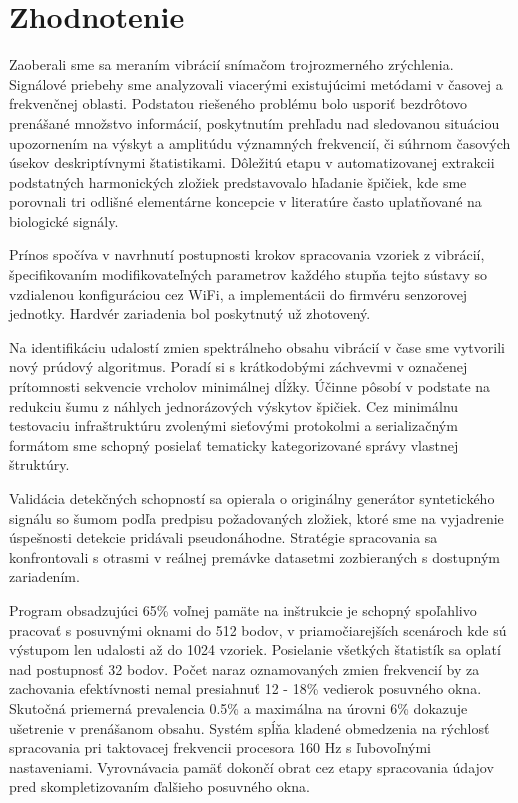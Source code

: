 \chapter{Zhodnotenie} \label{chapter:evaluation}
Zaoberali sme sa meraním vibrácií snímačom trojrozmerného zrýchlenia.
Signálové priebehy sme analyzovali viacerými existujúcimi metódami v časovej a frekvenčnej oblasti.
Podstatou riešeného problému bolo usporiť bezdrôtovo prenášané množstvo informácií, poskytnutím
prehľadu nad sledovanou situáciou upozornením na výskyt a amplitúdu významných frekvencií, či súhrnom
časových úsekov deskriptívnymi štatistikami. Dôležitú etapu v automatizovanej extrakcii
podstatných harmonických zložiek predstavovalo hľadanie špičiek, kde sme porovnali tri odlišné
elementárne koncepcie v literatúre často uplatňované na biologické signály.

Prínos spočíva v navrhnutí postupnosti krokov spracovania vzoriek z vibrácií, špecifikovaním
modifikovateľných parametrov každého stupňa tejto sústavy so vzdialenou konfiguráciou cez WiFi,
a implementácii do firmvéru senzorovej jednotky. Hardvér zariadenia bol poskytnutý už zhotovený.

Na identifikáciu udalostí zmien spektrálneho obsahu vibrácií v čase sme vytvorili nový prúdový algoritmus.
Poradí si s krátkodobými záchvevmi v označenej prítomnosti sekvencie vrcholov minimálnej dĺžky. Účinne pôsobí
v podstate na redukciu šumu z náhlych jednorázových výskytov špičiek. Cez minimálnu testovaciu infraštruktúru
zvolenými sieťovými protokolmi a serializačným formátom sme schopný posielať tematicky kategorizované správy vlastnej
štruktúry.

Validácia detekčných schopností sa opierala o originálny generátor syntetického signálu so šumom podľa
predpisu požadovaných zložiek, ktoré sme na vyjadrenie úspešnosti detekcie pridávali pseudonáhodne.
Stratégie spracovania sa konfrontovali s otrasmi v reálnej premávke datasetmi
zozbieraných s dostupným zariadením.

Program obsadzujúci 65\% voľnej pamäte na inštrukcie je schopný spoľahlivo pracovať s posuvnými
oknami do 512 bodov, v priamočiarejších scenároch kde sú výstupom len udalosti až do 1024 vzoriek.
Posielanie všetkých štatistík sa oplatí nad postupnosť 32 bodov. Počet naraz oznamovaných
zmien frekvencií by za zachovania efektívnosti nemal presiahnuť 12 - 18\% vedierok posuvného
okna. Skutočná priemerná prevalencia 0.5\% a maximálna na úrovni 6\% dokazuje ušetrenie v prenášanom obsahu.
Systém spĺňa kladené obmedzenia na rýchlosť spracovania pri taktovacej frekvencii procesora 160 Hz s ľubovoľnými
nastaveniami. Vyrovnávacia pamäť dokončí obrat cez etapy spracovania údajov pred skompletizovaním ďalšieho posuvného okna.

